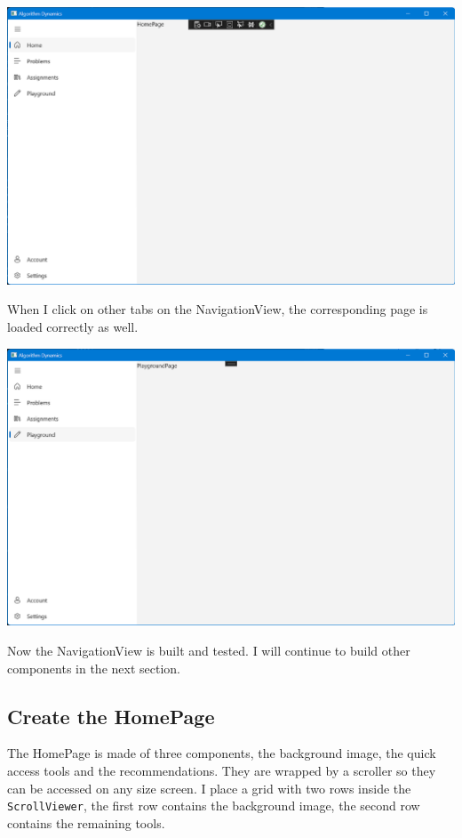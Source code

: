 \documentclass[a4paper]{report}
\begin{document}
\includegraphics[width=\textwidth, height=\textheight, keepaspectratio]{HomePage-Draft-TextBlock}


When I click on other tabs on the NavigationView, the corresponding page is loaded correctly as well.

\includegraphics[width=\textwidth, height=\textheight, keepaspectratio]{PlaygroundPage-Draft-TextBlock}

Now the NavigationView is built and tested. I will continue to build other components in the next section.

\subsection{Create the HomePage}

The HomePage is made of three components, the background image, the quick access tools and the recommendations. They are wrapped by a scroller so they can be accessed on any size screen. I place a grid with two rows inside the \texttt{ScrollViewer}, the first row contains the background image, the second row contains the remaining tools. 
\end{document}
